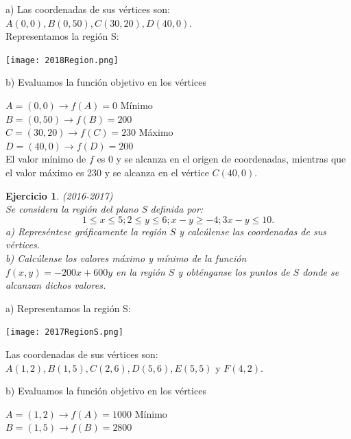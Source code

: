 \documentclass[12pt, a4paper]{amsart}
\newtheorem{ejer}{Ejercicio}
\newcommand{\s}{\color[rgb]{0,0,0.5}}
\newcommand{\n}{\color[rgb]{0,0,0}}
\begin{document}
a) Las coordenadas de sus vértices son: $A(0,0), B(0,50), C(30,20), D(40,0).$\\
Representamos la región S:

\begin{center}
\texttt{[image: 2018Region.png]}
\end{center}


b) Evaluamos la función objetivo en los vértices
 
$A=(0,0) \rightarrow f(A)=0$ Mínimo\\

$B=(0,50) \rightarrow f(B)=200$\\

$C=(30,20) \rightarrow f(C)=230$ Máximo\\

$D=(40,0) \rightarrow f(D)=200$\\

El valor mínimo de $f$ es 0 y se alcanza en el origen de coordenadas, mientras que el valor máximo es 230 y se alcanza en el vértice $C(40,0).$

\n

\begin{ejer}\em (2016-2017)\\
Se considera la región del plano S definida por:\\
\[
1\leq x\leq 5 ; 2\leq y \leq 6 ; x-y\geq -4 ; 3x-y\leq 10.
\]
a) Represéntese gráficamente la región $S$ y calcúlense las coordenadas de sus vértices.\\
b) Calcúlense los valores máximo y mínimo de la función $f (x, y) = - 200x + 600y$ en la región $S$ y obténganse los puntos de $S$ donde se alcanzan dichos valores.
\end{ejer}
\s

a) Representamos la región S:

\begin{center}
\texttt{[image: 2017RegionS.png]}
\end{center}



Las coordenadas de sus vértices son: $A(1,2), B(1,5), C(2,6), D(5,6), E(5,5)$ y $F(4,2).$\\

\newpage

b) Evaluamos la función objetivo en los vértices
 
$A=(1,2) \rightarrow f(A)=1000$ Mínimo\\

$B=(1,5) \rightarrow f(B)=2800$\\
\end{document}

